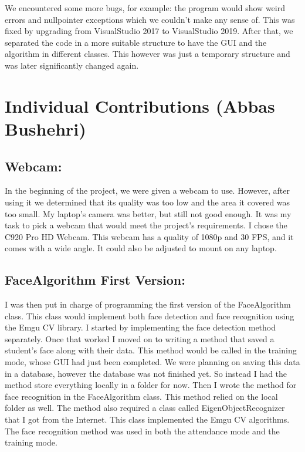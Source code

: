 \documentclass[12pt, a4paper]{article}
\begin{document}
We encountered some more bugs, for example: the program would show weird errors and nullpointer exceptions which we couldn't make any sense of. This was fixed by upgrading from VisualStudio 2017 to VisualStudio 2019. After that, we separated the code in a more suitable structure to have the GUI and the algorithm in different classes. This however was just a temporary structure and was later significantly changed again.



\newpage



\section{Individual Contributions (Abbas Bushehri)}
\subsection{Webcam:}
In the beginning of the project, we were given a webcam to use. However, after using it we determined that its quality was too low and the area it covered was too small. My laptop’s camera was better, but still not good enough. It was my task to pick a webcam that would meet the project’s requirements. I chose the C920 Pro HD Webcam. This webcam has a quality of 1080p and 30 FPS, and it comes with a wide angle. It could also be adjusted to mount on any laptop.

\subsection{FaceAlgorithm First Version:}
I was then put in charge of programming the first version of the FaceAlgorithm class. This class would implement both face detection and face recognition using the Emgu CV library. I started by implementing the face detection method separately. Once that worked I moved on to writing a method that saved a student’s face along with their data. This method would be called in the training mode, whose GUI had just been completed. We were planning on saving this data in a database, however the database was not finished yet. So instead I had the method store everything locally in a folder for now. Then I wrote the method for face recognition in the FaceAlgorithm class. This method relied on the local folder as well. The method also required a class called EigenObjectRecognizer that I got from the Internet. This class implemented the Emgu CV algorithms. The face recognition method was used in both the attendance mode and the training mode.
\end{document}
